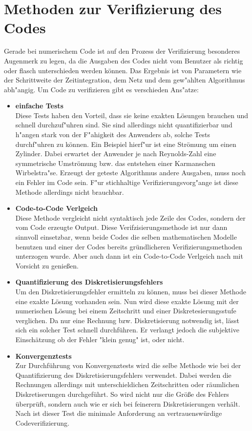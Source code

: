 \section{Methoden zur Verifizierung des Codes}
Gerade bei numerischem Code ist auf den Prozess der Verifizierung besonderes Augenmerk zu legen, da die Ausgaben des Codes nicht vom Benutzer als richtig oder flasch unterschieden werden können. Das Ergebnis ist von Parametern wie der Schrittweite der Zeitintegration, dem Netz und dem gew"ahlten Algorithmus abh"angig. Um Code zu verifizieren gibt es verschieden Ans"atze:
\begin{itemize}
	\item \textbf{einfache Tests}\\
	Diese Tests haben den Vorteil, dass sie keine exakten Lösungen brauchen und schnell durchzuf"uhren sind. Sie sind allerdings nicht quantifizierbar und h"angen stark von der F"ahigkeit des Anwenders ab, solche Tests durchf"uhren zu können.
	Ein Beispiel hierf"ur ist eine Strömung um einen Zylinder. Dabei erwartet der Anwender je nach Reynolds-Zahl eine symmetrische Umströmung bzw. das entstehen einer Karmanschen Wirbelstra"se. Erzeugt der geteste Algorithmus andere Ausgaben, muss noch ein Fehler im Code sein.
	F"ur stichhaltige Verifizierungsvorg"ange ist diese Methode allerdings nicht brauchbar.
	\item \textbf{Code-to-Code Verlgeich}\\
	Diese Methode vergleicht nicht syntaktisch jede Zeile des Codes, sondern der vom Code erzeugte Output. Diese Verifzisierungsmethode ist nur dann sinnvoll einsetzbar, wenn beide Codes die selben mathematischen Modelle benutzen und einer der Codes bereits gründlicheren Verifizierungsmethoden unterzogen wurde. Aber auch dann ist ein Code-to-Code Verlgeich nach \cite{bookMMS} mit Vorsicht zu genießen.
	\item \textbf{Quantifizierung des Diskretisierungsfehlers}\\
	Um den Diskretisierungsfehler ermitteln zu können, muss bei dieser Methode eine exakte Lösung vorhanden sein. Nun wird diese exakte Lösung mit der numerischen Lösung bei einem Zeitschritt und einer Diskretesierungsstufe verglichen. Da nur eine Rechnung bzw. Diskretisierung notwendig ist, lässt sich ein solcher Test schnell durchführen. Er verlangt jedoch die subjektive Einschätzung ob der Fehler "klein genug" ist, oder nicht.
	\item \textbf{Konvergenztests}\\
	Zur Durchführung von Konvergenztests wird die selbe Methode wie bei der Quantifizierung des Diskretisierungsfehlers verwendet. Dabei werden die Rechnungen allerdings mit unterschieldichen Zeitschritten oder räumlichen Diskretiserungen durchgeführt. So wird nicht nur die Größe des Fehlers überprüft, sondern auch wie er sich bei feinerern Diskretisierungen verhält. Nach \cite{bookMMS} ist dieser Test die minimale Anforderung an vertrauenswürdige Codeverifizierung.

\end{itemize}
